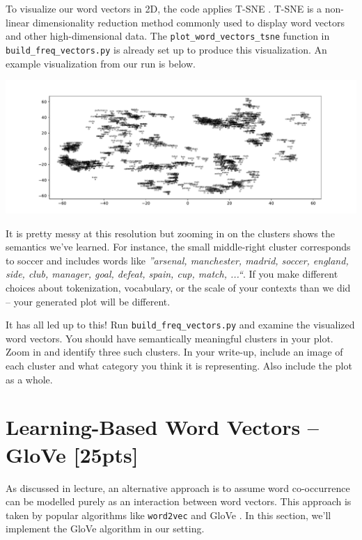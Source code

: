 \documentclass[a4paper,10pt]{article}
\begin{document}
 To visualize our word vectors in 2D, the code applies T-SNE \cite{maaten2008visualizing}. T-SNE is a non-linear dimensionality reduction method commonly used to display word vectors and other high-dimensional data. The \texttt{plot\_word\_vectors\_tsne} function in \texttt{build\_freq\_vectors.py} is already set up to produce this visualization. An example visualization from our run is below.
%
\begin{center}
\includegraphics[width=\textwidth]{figures/wordvectors.pdf}
\end{center}
%
It is pretty messy at this resolution but zooming in on the clusters shows the semantics we've learned. For instance, the small middle-right cluster corresponds to soccer and includes words like \emph{''arsenal, manchester, madrid, soccer, england, side, club, manager, goal, defeat, spain, cup, match, ...``}. If you make different choices about tokenization, vocabulary, or the scale of your contexts than we did -- your generated plot will be different.

\vspace{5pt}
\begin{taskbox}
 It has all led up to this! Run \texttt{build\_freq\_vectors.py} and examine the visualized word vectors. You should have semantically meaningful clusters in your plot. Zoom in and identify three such clusters. In your write-up, include an image of each cluster and what category you think it is representing. Also include the plot as a whole.
\end{taskbox}
\vspace{5pt}

\newpage
\section{Learning-Based Word Vectors -- GloVe [25pts]}
As discussed in lecture, an alternative approach is to assume word co-occurrence can be modelled purely as an interaction between word vectors. This approach is taken by popular algorithms like \texttt{word2vec}\cite{mikolov2013efficient} and GloVe \cite{pennington2014glove}. In this section, we'll implement the GloVe algorithm in our setting.
\end{document}
